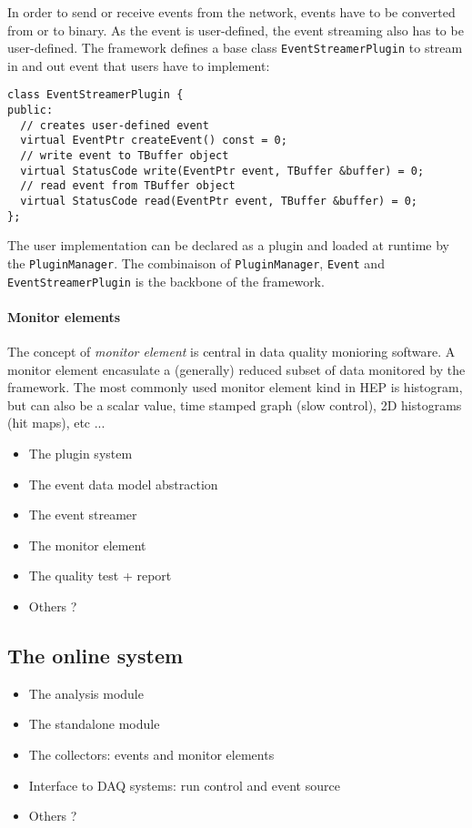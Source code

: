 \documentclass{webofc}
\begin{document}
In order to send or receive events from the network, events have to be converted from or to binary. As the event is user-defined, the event streaming also has to be user-defined. The framework defines a base class \texttt{EventStreamerPlugin} to stream in and out event that users have to implement:

\begin{lstlisting}
class EventStreamerPlugin {
public:
  // creates user-defined event
  virtual EventPtr createEvent() const = 0;
  // write event to TBuffer object
  virtual StatusCode write(EventPtr event, TBuffer &buffer) = 0;
  // read event from TBuffer object
  virtual StatusCode read(EventPtr event, TBuffer &buffer) = 0;
};
\end{lstlisting}

The user implementation can be declared as a plugin and loaded at runtime by the \texttt{PluginManager}. The combinaison of \texttt{PluginManager}, \texttt{Event} and \texttt{EventStreamerPlugin} is the backbone of the framework.

\paragraph{Monitor elements}

The concept of \textit{monitor element} is central in data quality monioring software. A monitor element encasulate a (generally) reduced subset of data monitored by the framework. The most commonly used monitor element kind in HEP is histogram, but can also be a scalar value, time stamped graph (slow control), 2D histograms (hit maps), etc ... 



\begin{itemize}
  \item The plugin system
  \item The event data model abstraction
  \item The event streamer
  \item The monitor element
  \item The quality test + report
  \item Others ?
\end{itemize}

\subsection{The online system}
\label{subsec:online}

\begin{itemize}
  \item The analysis module
  \item The standalone module
  \item The collectors: events and monitor elements
  \item Interface to DAQ systems: run control and event source
  \item Others ?
\end{itemize}
\end{document}
